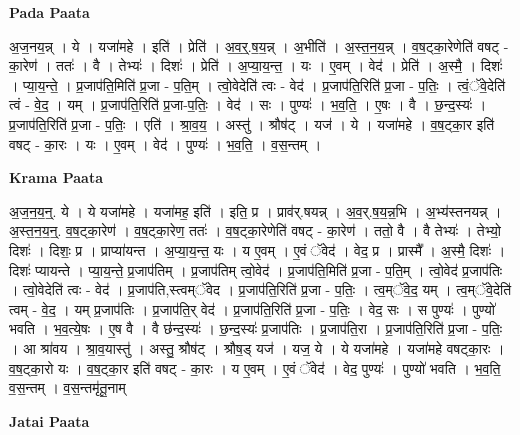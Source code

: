 \documentclass[17pt]{extarticle}
\begin{document}
\textbf{Pada Paata} \newline

अ॒ज॒नय॒न्न् । ये । यजा॑महे । इति॑ । प्रेति॑ । अ॒व॒र्॒.ष॒य॒न्न् । अ॒भीति॑ । अ॒स्त॒न॒य॒न्न् । व॒ष॒ट्का॒रेणेति॑ वषट् - का॒रेण॑ । ततः॑ । वै । तेभ्यः॑ । दिशः॑ । प्रेति॑ । अ॒प्या॒य॒न्त॒ । यः । ए॒वम् । वेद॑ । प्रेति॑ । अ॒स्मै॒ । दिशः॑ । प्या॒य॒न्ते॒ । प्र॒जाप॑ति॒मिति॑ प्र॒जा - प॒ति॒म् । त्वो॒वेदेति॑ त्वः - वेद॑ । प्र॒जाप॑ति॒रिति॑ प्र॒जा - प॒तिः॒ । त्वं॒ॅवे॒देति॑  त्वं - वे॒द॒ । यम् । प्र॒जाप॑ति॒रिति॑ प्र॒जा-प॒तिः॒ । वेद॑ । सः । पुण्यः॑ । भ॒व॒ति॒ । ए॒षः । वै । छ॒न्द॒स्यः॑ । प्र॒जाप॑ति॒रिति॑ प्र॒जा - प॒तिः॒ । एति॑ । श्रा॒व॒य॒ । अस्तु॑ । श्रौष॑ट् । यज॑ । ये । यजा॑महे । व॒ष॒ट्का॒र इति॑ वषट् - का॒रः । यः । ए॒वम् । वेद॑ । पुण्यः॑ । भ॒व॒ति॒ । व॒स॒न्तम् ।  \newline


\textbf{Krama Paata} \newline

अ॒ज॒न॒य॒न्॒. ये । ये यजा॑महे । यजा॑मह॒ इति॑ । इति॒ प्र । प्राव॑र्.षयन्न् । अ॒व॒र्.ष॒य॒न्न॒भि । अ॒भ्य॑स्तनयन्न् । अ॒स्त॒न॒य॒न्॒. व॒ष॒ट्का॒रेण॑ । व॒ष॒ट्का॒रेण॒ ततः॑ । व॒ष॒ट्का॒रेणेति॑ वषट् - का॒रेण॑ । ततो॒ वै । वै तेभ्यः॑ । तेभ्यो॒ दिशः॑ । दिशः॒ प्र । प्राप्या॑यन्त । अ॒प्या॒य॒न्त॒ यः । य ए॒वम् । ए॒वं ॅवेद॑ । वेद॒ प्र । प्रास्मै᳚ । अ॒स्मै॒ दिशः॑ । दिशः॑ प्यायन्ते । प्या॒य॒न्ते॒ प्र॒जाप॑तिम् । प्र॒जाप॑तिम् त्वो॒वेद॑ । प्र॒जाप॑ति॒मिति॑ प्र॒जा - प॒ति॒म् । त्वो॒वेद॑ प्र॒जाप॑तिः । त्वो॒वेदेति॑ त्वः - वेद॑ । प्र॒जाप॑ति,स्त्वम्ॅवेद । प्र॒जाप॑ति॒रिति॑ प्र॒जा - प॒तिः॒ । त्व॒म्ॅवे॒द॒ यम् । त्व॒म्ॅवे॒देति॑ त्वम् - वे॒द॒ । यम् प्र॒जाप॑तिः । प्र॒जाप॑ति॒र् वेद॑ । प्र॒जाप॑ति॒रिति॑ प्र॒जा - प॒तिः॒ । वेद॒ सः । स पुण्यः॑ । पुण्यो॑ भवति । भ॒व॒त्ये॒षः । ए॒ष वै । वै छ॑न्द॒स्यः॑ । छ॒न्द॒स्यः॑ प्र॒जाप॑तिः । प्र॒जाप॑ति॒रा । प्र॒जाप॑ति॒रिति॑ प्र॒जा - प॒तिः॒ । आ श्रा॑वय । श्रा॒व॒यास्तु॑ । अस्तु॒ श्रौष॑ट् । श्रौष॒ड् यज॑ । यज॒ ये । ये यजा॑महे । यजा॑महे वषट्का॒रः । व॒ष॒ट्का॒रो यः । व॒ष॒ट्का॒र इति॑ वषट् - का॒रः । य ए॒वम् । ए॒वं ॅवेद॑ । वेद॒ पुण्यः॑ । पुण्यो॑ भवति । भ॒व॒ति॒ व॒स॒न्तम् । व॒स॒न्तमृ॑तू॒नाम् \newline

\textbf{Jatai Paata} \newline
\end{document}
